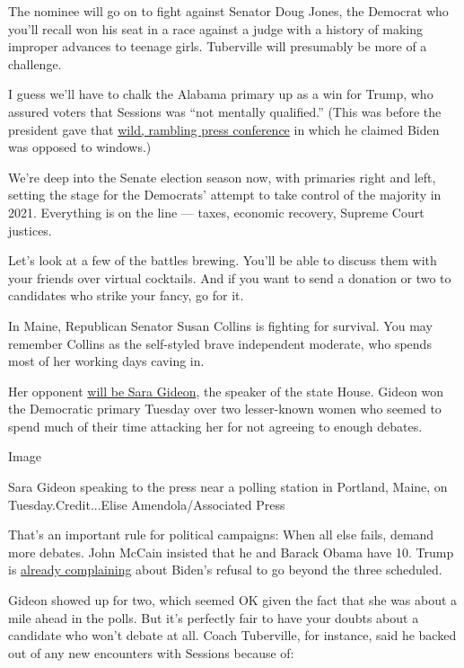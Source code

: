 The nominee will go on to fight against Senator Doug Jones, the Democrat
who you'll recall won his seat in a race against a judge with a history
of making improper advances to teenage girls. Tuberville will presumably
be more of a challenge.

I guess we'll have to chalk the Alabama primary up as a win for Trump,
who assured voters that Sessions was ``not mentally qualified.'' (This
was before the president gave that
\href{https://www.nytimes.com/2020/07/14/us/politics/trump-news-conference.html}{wild,
rambling press conference} in which he claimed Biden was opposed to
windows.)

We're deep into the Senate election season now, with primaries right and
left, setting the stage for the Democrats' attempt to take control of
the majority in 2021. Everything is on the line --- taxes, economic
recovery, Supreme Court justices.

Let's look at a few of the battles brewing. You'll be able to discuss
them with your friends over virtual cocktails. And if you want to send a
donation or two to candidates who strike your fancy, go for it.

In Maine, Republican Senator Susan Collins is fighting for survival. You
may remember Collins as the self-styled brave independent moderate, who
spends most of her working days caving in.

Her opponent
\href{https://www.nytimes.com/2020/07/14/us/politics/sara-gideon-maine.html}{will
be Sara Gideon}, the speaker of the state House. Gideon won the
Democratic primary Tuesday over two lesser-known women who seemed to
spend much of their time attacking her for not agreeing to enough
debates.

Image

Sara Gideon speaking to the press near a polling station in Portland,
Maine, on Tuesday.Credit...Elise Amendola/Associated Press

That's an important rule for political campaigns: When all else fails,
demand more debates. John McCain insisted that he and Barack Obama have
10. Trump is
\href{https://www.politico.com/news/2020/06/18/trump-joe-biden-debates-328356}{already
complaining} about Biden's refusal to go beyond the three scheduled.

Gideon showed up for two, which seemed OK given the fact that she was
about a mile ahead in the polls. But it's perfectly fair to have your
doubts about a candidate who won't debate at all. Coach Tuberville, for
instance, said he backed out of any new encounters with Sessions because
of:

